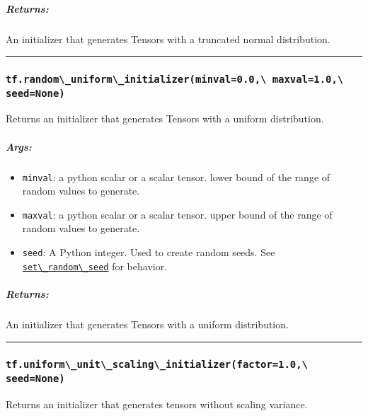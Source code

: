 \subparagraph{Returns: }\label{returns-22}

An initializer that generates Tensors with a truncated normal
distribution.

\begin{center}\rule{0.5\linewidth}{\linethickness}\end{center}

\subsubsection{\texorpdfstring{\lstinline{tf.random\_uniform\_initializer(minval=0.0,\ maxval=1.0,\ seed=None)}
}{tf.random\_uniform\_initializer(minval=0.0, maxval=1.0, seed=None) }}\label{tf.randomux5funiformux5finitializerminval0.0-maxval1.0-seednone}

Returns an initializer that generates Tensors with a uniform
distribution.

\subparagraph{Args: }\label{args-21}

\begin{itemize}
\tightlist
\item
  \lstinline{minval}: a python scalar or a scalar tensor. lower bound of
  the range of random values to generate.
\item
  \lstinline{maxval}: a python scalar or a scalar tensor. upper bound of
  the range of random values to generate.
\item
  \lstinline{seed}: A Python integer. Used to create random seeds. See
  \href{../../api_docs/python/constant_op.md\#set_random_seed}{\lstinline{set\_random\_seed}}
  for behavior.
\end{itemize}

\subparagraph{Returns: }\label{returns-23}

An initializer that generates Tensors with a uniform distribution.

\begin{center}\rule{0.5\linewidth}{\linethickness}\end{center}

\subsubsection{\texorpdfstring{\lstinline{tf.uniform\_unit\_scaling\_initializer(factor=1.0,\ seed=None)}
}{tf.uniform\_unit\_scaling\_initializer(factor=1.0, seed=None) }}\label{tf.uniformux5funitux5fscalingux5finitializerfactor1.0-seednone}

Returns an initializer that generates tensors without scaling variance.

